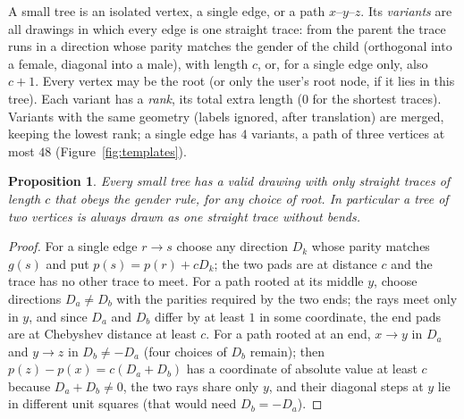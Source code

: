 \documentclass[11pt,a4paper]{article}
\newtheorem{proposition}{Proposition}
\theoremstyle{remark}
\newcommand{\pos}{p}
\begin{document}
A small tree is an isolated vertex, a single edge, or a path $x$--$y$--$z$. Its \emph{variants} are all drawings in
which every edge is one straight trace: from the parent the trace runs in a direction whose parity matches the gender
of the child (orthogonal into a female, diagonal into a male), with length $c$, or, for a single edge only, also $c+1$.
Every vertex may be the root (or only the user's root node, if it lies in this tree). Each variant has a \emph{rank},
its total extra length ($0$ for the shortest traces). Variants with the same geometry (labels ignored, after
translation) are merged, keeping the lowest rank; a single edge has $4$ variants, a path of three vertices at most
$48$ (Figure~\ref{fig:templates}).

\begin{proposition}\label{prop:straight}
Every small tree has a valid drawing with only straight traces of length $c$ that obeys the gender rule, for any
choice of root. In particular a tree of two vertices is always drawn as one straight trace without bends.
\end{proposition}
\begin{proof}
For a single edge $r\to s$ choose any direction $D_k$ whose parity matches $g(s)$ and put $\pos(s)=\pos(r)+cD_k$; the
two pads are at distance $c$ and the trace has no other trace to meet. For a path rooted at its middle $y$, choose
directions $D_a\ne D_b$ with the parities required by the two ends; the rays meet only in $y$, and since $D_a$ and
$D_b$ differ by at least $1$ in some coordinate, the end pads are at Chebyshev distance at least $c$. For a path
rooted at an end, $x\to y$ in $D_a$ and $y\to z$ in $D_b\ne -D_a$ (four choices of $D_b$ remain); then
$\pos(z)-\pos(x)=c(D_a+D_b)$ has a coordinate of absolute value at least $c$ because $D_a+D_b\ne 0$, the two rays share
only $y$, and their diagonal steps at $y$ lie in different unit squares (that would need $D_b=-D_a$).
\end{proof}
\end{document}
